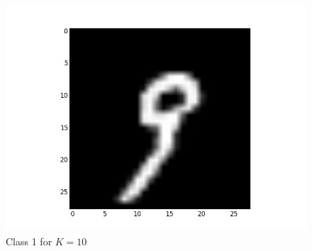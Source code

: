 \documentclass[submit]{harvardml}
\begin{document}
\begin{figure}[ht]
    \includegraphics[scale=0.20]{representative-0-2}
    \caption{Class 1 for $K=10$}
\end{figure}
\end{document}
